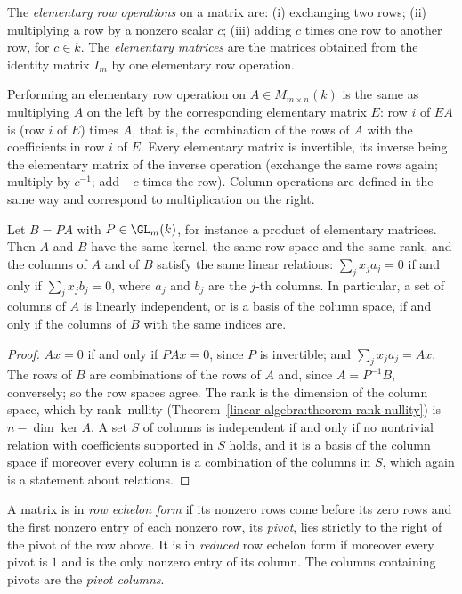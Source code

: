 \begin{definition}\label{linear-algebra:definition-elementary-operations}
The \emph{elementary row operations} on a matrix are: (i) exchanging two rows; (ii) multiplying a row by a nonzero scalar $c$; (iii) adding $c$ times one row to another row, for $c \in k$. The
\emph{elementary matrices} are the matrices obtained from the identity matrix $I_m$ by one elementary row operation.
\end{definition}

Performing an elementary row operation on $A \in M_{m \times n}(k)$ is the same as multiplying $A$ on the left by the corresponding elementary matrix $E$: row $i$ of $EA$ is (row $i$ of $E$) times $A$,
that is, the combination of the rows of $A$ with the coefficients in row $i$ of $E$. Every elementary matrix is invertible, its inverse being the elementary matrix of the inverse operation (exchange
the same rows again; multiply by $c^{-1}$; add $-c$ times the row). Column operations are defined in the same way and correspond to multiplication on the right.

\begin{lemma}\label{linear-algebra:lemma-row-operations}
Let $B = PA$ with $P \in \GL_m(k)$, for instance a product of elementary matrices. Then $A$ and $B$ have the same kernel, the same row space and the same rank, and the columns of $A$ and of $B$ satisfy
the same linear relations: $\sum_jx_ja_j = 0$ if and only if $\sum_jx_jb_j = 0$, where $a_j$ and $b_j$ are the $j$-th columns. In particular, a set of columns of $A$ is linearly independent, or is a basis
of the column space, if and only if the columns of $B$ with the same indices are.
\end{lemma}

\begin{proof}
$Ax = 0$ if and only if $PAx = 0$, since $P$ is invertible; and $\sum_jx_ja_j = Ax$. The rows of $B$ are combinations of the rows of $A$ and, since $A = P^{-1}B$, conversely; so the row spaces agree. The
rank is the dimension of the column space, which by rank--nullity (Theorem~\ref{linear-algebra:theorem-rank-nullity}) is $n - \dim\ker A$. A set $S$ of columns is independent if and only if no
nontrivial relation with coefficients supported in $S$ holds, and it is a basis of the column space if moreover every column is a combination of the columns in $S$, which again is a statement about
relations.
\end{proof}

\begin{definition}\label{linear-algebra:definition-echelon}
A matrix is in \emph{row echelon form} if its nonzero rows come before its zero rows and the first nonzero entry of each nonzero row, its \emph{pivot}, lies strictly to the right of the pivot of the row
above. It is in \emph{reduced} row echelon form if moreover every pivot is $1$ and is the only nonzero entry of its column. The columns containing pivots are the \emph{pivot columns}.
\end{definition}

